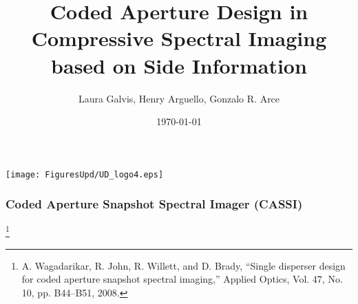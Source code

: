 \documentclass{beamer}
\title[\textbf{Coded Aperture Design in CSI}]{Coded Aperture Design in Compressive Spectral Imaging based on Side Information}
\author[\textbf{L. Galvis, H. Arguello, G.R. Arce}]{Laura Galvis, Henry Arguello, Gonzalo R. Arce}
\institute[\textbf{UDEL}]{Electrical and Computer Engineering\\
University of Delaware\\
Newark}
\date{\today}
\begin{document}
\begin{frame}
\titlepage
\begin{center}
\texttt{[image: FiguresUpd/UD\_logo4.eps]}
\end{center}
\end{frame}



\begin{frame}
\frametitle{Coded Aperture Snapshot Spectral Imager (CASSI)}

\vspace{-15pt}
\begin{figure}
\vspace{-15pt}
\end{figure}
\footnote{\tiny{A. Wagadarikar, R. John, R. Willett, and D. Brady, “Single disperser design for coded aperture snapshot spectral imaging,” Applied Optics, Vol. 47, No. 10, pp. B44–B51, 2008.}}
\end{frame}
\end{document}
